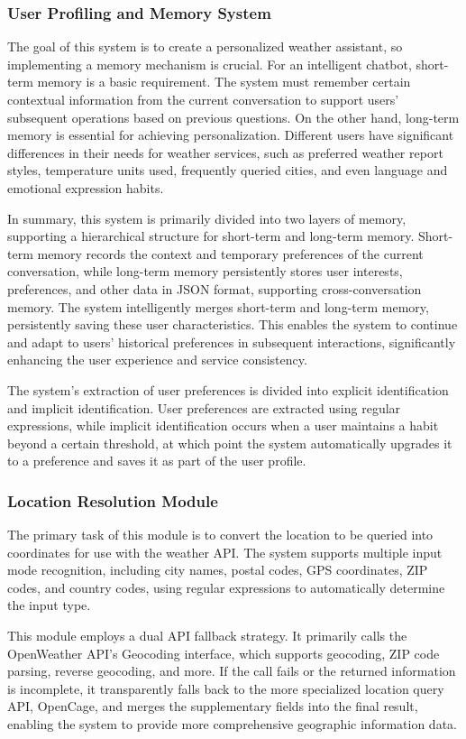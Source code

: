 \documentclass[final-report]{report-template}
\begin{document}
\subsubsection{User Profiling and Memory System}
The goal of this system is to create a personalized weather assistant, so implementing a memory mechanism is crucial. For an intelligent chatbot, short-term memory is a basic requirement. The system must remember certain contextual information from the current conversation to support users' subsequent operations based on previous questions. On the other hand, long-term memory is essential for achieving personalization. Different users have significant differences in their needs for weather services, such as preferred weather report styles, temperature units used, frequently queried cities, and even language and emotional expression habits.

In summary, this system is primarily divided into two layers of memory, supporting a hierarchical structure for short-term and long-term memory. Short-term memory records the context and temporary preferences of the current conversation, while long-term memory persistently stores user interests, preferences, and other data in JSON format, supporting cross-conversation memory. The system intelligently merges short-term and long-term memory, persistently saving these user characteristics. This enables the system to continue and adapt to users' historical preferences in subsequent interactions, significantly enhancing the user experience and service consistency.

The system's extraction of user preferences is divided into explicit identification and implicit identification. User preferences are extracted using regular expressions, while implicit identification occurs when a user maintains a habit beyond a certain threshold, at which point the system automatically upgrades it to a preference and saves it as part of the user profile.

\subsubsection{Location Resolution Module}
The primary task of this module is to convert the location to be queried into coordinates for use with the weather API. The system supports multiple input mode recognition, including city names, postal codes, GPS coordinates, ZIP codes, and country codes, using regular expressions to automatically determine the input type.

This module employs a dual API fallback strategy. It primarily calls the OpenWeather API's Geocoding interface, which supports geocoding, ZIP code parsing, reverse geocoding, and more. If the call fails or the returned information is incomplete, it transparently falls back to the more specialized location query API, OpenCage, and merges the supplementary fields into the final result, enabling the system to provide more comprehensive geographic information data.  
\end{document}
